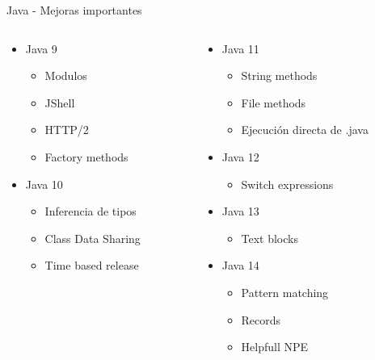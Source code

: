 \documentclass[aspectratio=169]{beamer}
\begin{document}
\begin{frame}[fragile]{Java - Mejoras importantes}
\begin{columns}[T]
		\begin{column}[T]{5cm} %
			\begin{itemize}
				\item Java 9
				\begin{itemize}
					\item Modulos
					\item JShell
					\item HTTP/2
                    \item Factory methods
				\end{itemize}
				\item Java 10
				\begin{itemize}
					\item Inferencia de tipos
					\item Class Data Sharing
					\item Time based release
				\end{itemize}
			\end{itemize}
		\end{column}
		\begin{column}[T]{5cm} %
			\begin{itemize}
                \item Java 11
                \begin{itemize}
                    \item String methods
                    \item File methods
                    \item Ejecución directa de .java
                \end{itemize}
				\item Java 12
				\begin{itemize}
					\item Switch expressions
				\end{itemize}
				\item Java 13
				\begin{itemize}
					\item Text blocks
				\end{itemize}
				\item Java 14
				\begin{itemize}
					\item Pattern matching
					\item Records
					\item Helpfull NPE
				\end{itemize}
			\end{itemize}
		\end{column}
	\end{columns}
\end{frame}
\end{document}

